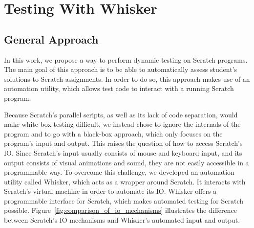 
\chapter{Testing With Whisker}


\section{General Approach}

In this work, we propose a way to perform dynamic testing on Scratch programs.
The main goal of this approach is to be able to automatically assess student's solutions to Scratch assignments.
In order to do so, this approach makes use of an automation utility, which allows test code to interact with a running Scratch program.
\parspace

Because Scratch's parallel scripts, as well as its lack of code separation, would make white-box testing difficult,
we instead chose to ignore the internals of the program and to go with a black-box approach, which only focuses on the program's input and output.
This raises the question of how to access Scratch's IO.
Since Scratch's input usually consists of mouse and keyboard input, and its output consists of visual animations and sound,
they are not easily accessible in a programmable way.
To overcome this challenge, we developed an automation utility called Whisker, which acts as a wrapper around Scratch.
It interacts with Scratch's virtual machine in order to automate its IO.
Whisker offers a programmable interface for Scratch, which makes automated testing for Scratch possible.
Figure~\ref{fig:comparison_of_io_mechanisms} illustrates the difference between Scratch's IO mechanisms and Whisker's automated input and output.

